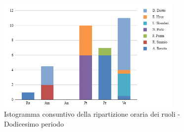 \begin{figure}[H]
    \centering
    \includegraphics[width=0.8\textwidth]{../Images/consuntivoDivisioneRuoli12Periodo.png}
    \caption{Istogramma consuntivo della ripartizione oraria dei ruoli - Dodicesimo periodo}
    \label{fig:Consuntivo_ripartizione_oraria_12}
\end{figure}